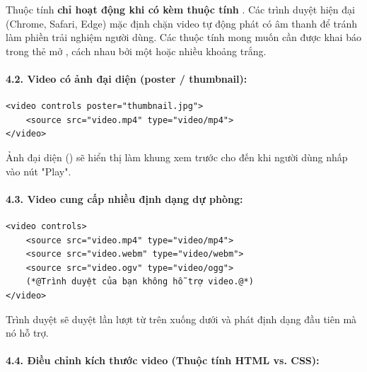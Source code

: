 \begin{warnBox}
Thuộc tính  \textbf{chỉ hoạt động khi có kèm thuộc tính }. Các trình duyệt hiện đại (Chrome, Safari, Edge) mặc định chặn video tự động phát có âm thanh để tránh làm phiền trải nghiệm người dùng. Các thuộc tính mong muốn cần được khai báo trong thẻ mở , cách nhau bởi một hoặc nhiều khoảng trắng.
\end{warnBox}

\paragraph{4.2. Video có ảnh đại diện (poster / thumbnail):}

\begin{codeWindow}
\begin{lstlisting}[language=HTML5]
<video controls poster="thumbnail.jpg">
    <source src="video.mp4" type="video/mp4">
</video>
\end{lstlisting}
\end{codeWindow}

Ảnh đại diện () sẽ hiển thị làm khung xem trước cho đến khi người dùng nhấp vào nút "Play".

\paragraph{4.3. Video cung cấp nhiều định dạng dự phòng:}

\begin{codeWindow}
\begin{lstlisting}[language=HTML5]
<video controls>
    <source src="video.mp4" type="video/mp4">
    <source src="video.webm" type="video/webm">
    <source src="video.ogv" type="video/ogg">
    (*@Trình duyệt của bạn không hỗ trợ video.@*)
</video>
\end{lstlisting}
\end{codeWindow}

Trình duyệt sẽ duyệt lần lượt từ trên xuống dưới và phát định dạng đầu tiên mà nó hỗ trợ.

\paragraph{4.4. Điều chỉnh kích thước video (Thuộc tính HTML vs. CSS):}

